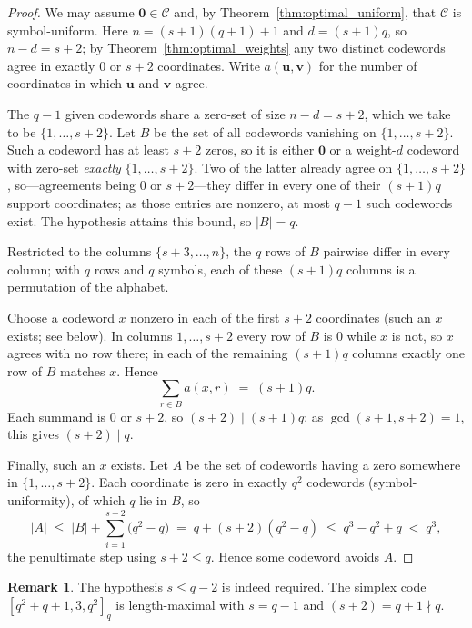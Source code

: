 \documentclass[12pt, letterpaper]{article}
\theoremstyle{plain}
\theoremstyle{definition}
\newtheorem{remark}[theorem]{Remark}
\begin{document}
	\begin{proof}
		We may assume $\mathbf{0} \in \mathcal{C}$ and, by Theorem~\ref{thm:optimal_uniform}, that $\mathcal{C}$ is symbol-uniform. Here $n = (s+1)(q+1)+1$ and $d = (s+1)q$, so $n-d = s+2$; by Theorem~\ref{thm:optimal_weights} any two distinct codewords agree in exactly $0$ or $s+2$ coordinates. Write $a(\mathbf{u},\mathbf{v})$ for the number of coordinates in which $\mathbf{u}$ and $\mathbf{v}$ agree.

		The $q-1$ given codewords share a zero-set of size $n-d = s+2$, which we take to be $\{1,\dots,s+2\}$. Let $B$ be the set of all codewords vanishing on $\{1,\dots,s+2\}$. Such a codeword has at least $s+2$ zeros, so it is either $\mathbf{0}$ or a weight-$d$ codeword with zero-set \emph{exactly} $\{1,\dots,s+2\}$. Two of the latter already agree on $\{1,\dots,s+2\}$, so---agreements being $0$ or $s+2$---they differ in every one of their $(s+1)q$ support coordinates; as those entries are nonzero, at most $q-1$ such codewords exist. The hypothesis attains this bound, so $|B| = q$.

		Restricted to the columns $\{s+3,\dots,n\}$, the $q$ rows of $B$ pairwise differ in every column; with $q$ rows and $q$ symbols, each of these $(s+1)q$ columns is a permutation of the alphabet.

		Choose a codeword $x$ nonzero in each of the first $s+2$ coordinates (such an $x$ exists; see below). In columns $1,\dots,s+2$ every row of $B$ is $0$ while $x$ is not, so $x$ agrees with no row there; in each of the remaining $(s+1)q$ columns exactly one row of $B$ matches $x$. Hence
		\[
		\sum_{r \in B} a(x,r) \;=\; (s+1)q .
		\]
		Each summand is $0$ or $s+2$, so $(s+2) \mid (s+1)q$; as $\gcd(s+1,s+2)=1$, this gives $(s+2) \mid q$.

		Finally, such an $x$ exists. Let $A$ be the set of codewords having a zero somewhere in $\{1,\dots,s+2\}$. Each coordinate is zero in exactly $q^2$ codewords (symbol-uniformity), of which $q$ lie in $B$, so
		\[
		|A| \;\le\; |B| + \sum_{i=1}^{s+2}\bigl(q^2 - q\bigr) \;=\; q + (s+2)(q^2-q) \;\le\; q^3 - q^2 + q \;<\; q^3,
		\]
		the penultimate step using $s+2 \le q$. Hence some codeword avoids $A$.
	\end{proof}

	\begin{remark}
		The hypothesis $s \le q-2$ is indeed required. The simplex code $[q^2+q+1,3,q^2]_q$ is length-maximal with $s = q-1$ and $(s+2) = q+1 \nmid q$.
	\end{remark}
\end{document}
